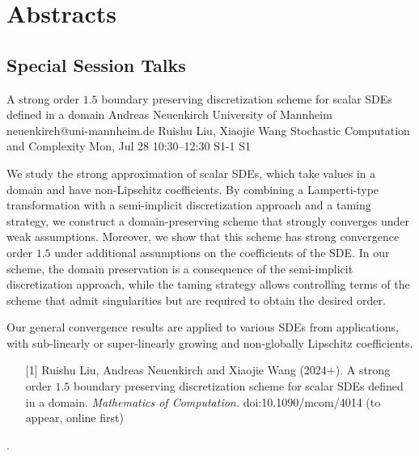 \chapter{Abstracts}\newpage\section{Special Session Talks}

\begin{talk}
  {A strong order $1.5$ boundary preserving discretization scheme for scalar SDEs defined in a domain}%
  {Andreas Neuenkirch}%
  {University of Mannheim}%
  {neuenkirch@uni-mannheim.de}%
  {Ruishu Liu, Xiaojie Wang}%
  {Stochastic Computation and Complexity}%
  {Mon, Jul 28 10:30–12:30}%
  {S1-1}%
  {S1}%
				
			
We study the strong approximation of scalar SDEs, which take values in a domain and have non-Lipschitz coefficients.
By combining a Lamperti-type transformation with a semi-implicit discretization approach and a taming 
strategy,  we construct a domain-preserving scheme that strongly converges under weak assumptions. 
Moreover,
we show that this scheme has strong convergence order $1.5$ under additional assumptions on the coefficients of the SDE. In our scheme, the domain preservation is a consequence of the semi-implicit discretization approach, while the taming strategy allows controlling terms of the scheme that admit singularities but are required to obtain the desired order.

Our general convergence results  are  applied to various SDEs from applications, with sub-linearly or super-linearly growing and non-globally Lipschitz coefficients.


\medskip

\begin{enumerate}
	\item[{[1]}]  Ruishu Liu, Andreas Neuenkirch and Xiaojie Wang (2024+). A strong order $1.5$
	boundary preserving discretization scheme for scalar SDEs defined in a domain. {\it Mathematics of Computation.} doi:10.1090/mcom/4014 (to appear, online first)
\end{enumerate}
.
\end{talk}

